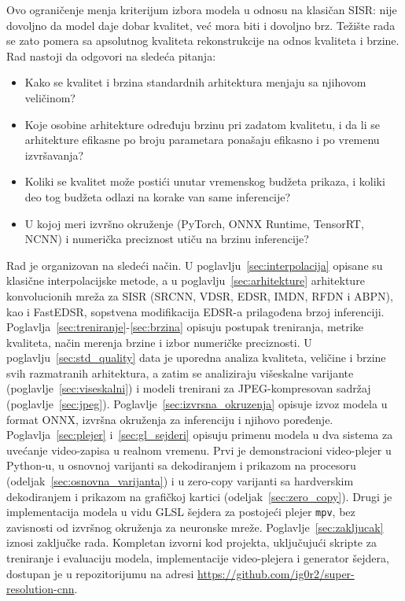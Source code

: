 \documentclass[12pt,a4paper]{article}
\begin{document}
Ovo ograničenje menja kriterijum izbora modela u odnosu na klasičan SISR: nije dovoljno da model daje dobar kvalitet, već mora biti i dovoljno brz. Težište rada se zato pomera sa apsolutnog kvaliteta rekonstrukcije na odnos kvaliteta i brzine. Rad nastoji da odgovori na sledeća pitanja:
\begin{itemize}[itemsep=0pt]
	\item Kako se kvalitet i brzina standardnih arhitektura menjaju sa njihovom veličinom?
	\item Koje osobine arhitekture određuju brzinu pri zadatom kvalitetu, i da li se arhitekture efikasne po broju parametara ponašaju efikasno i po vremenu izvršavanja?
	\item Koliki se kvalitet može postići unutar vremenskog budžeta prikaza, i koliki deo tog budžeta odlazi na korake van same inferencije?
	\item U kojoj meri izvršno okruženje (PyTorch, ONNX Runtime, TensorRT, NCNN) i numerička preciznost utiču na brzinu inferencije?
\end{itemize}

Rad je organizovan na sledeći način. U poglavlju~\ref{sec:interpolacija} opisane su klasične interpolacijske metode, a u poglavlju~\ref{sec:arhitekture} arhitekture konvolucionih mreža za SISR (SRCNN, VDSR, EDSR, IMDN, RFDN i ABPN), kao i FastEDSR, sopstvena modifikacija EDSR-a prilagođena brzoj inferenciji. Poglavlja~\ref{sec:treniranje}-\ref{sec:brzina} opisuju postupak treniranja, metrike kvaliteta, način merenja brzine i izbor numeričke preciznosti. U poglavlju~\ref{sec:std_quality} data je uporedna analiza kvaliteta, veličine i brzine svih razmatranih arhitektura, a zatim se analiziraju višeskalne varijante (poglavlje~\ref{sec:viseskalni}) i modeli trenirani za JPEG-kompresovan sadržaj (poglavlje~\ref{sec:jpeg}). Poglavlje~\ref{sec:izvrsna_okruzenja} opisuje izvoz modela u format ONNX, izvršna okruženja za inferenciju i njihovo poređenje. Poglavlja~\ref{sec:plejer} i~\ref{sec:gl_sejderi} opisuju primenu modela u dva sistema za uvećanje video-zapisa u realnom vremenu. Prvi je demonstracioni video-plejer u Python-u, u osnovnoj varijanti sa dekodiranjem i prikazom na procesoru (odeljak~\ref{sec:osnovna_varijanta}) i u zero-copy varijanti sa hardverskim dekodiranjem i prikazom na grafičkoj kartici (odeljak~\ref{sec:zero_copy}). Drugi je implementacija modela u vidu GLSL šejdera za postojeći plejer \texttt{mpv}, bez zavisnosti od izvršnog okruženja za neuronske mreže. Poglavlje~\ref{sec:zakljucak} iznosi zaključke rada. Kompletan izvorni kod projekta, uključujući skripte za treniranje i evaluaciju modela, implementacije video-plejera i generator šejdera, dostupan je u repozitorijumu na adresi \url{https://github.com/ig0r2/super-resolution-cnn}.
\end{document}
